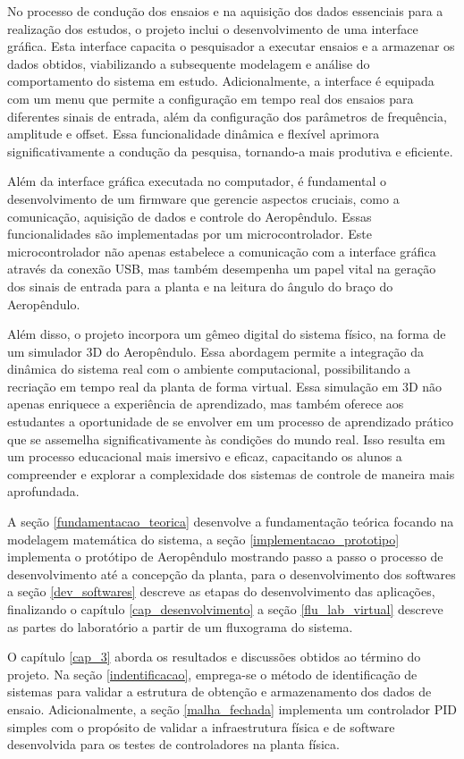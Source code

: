 No processo de condução dos ensaios e na aquisição dos dados essenciais para a realização dos estudos, o projeto inclui o desenvolvimento de uma interface gráfica. Esta interface capacita o pesquisador a executar ensaios e a armazenar os dados obtidos, viabilizando a subsequente modelagem e análise do comportamento do sistema em estudo. Adicionalmente, a interface é equipada com um menu que permite a configuração em tempo real dos ensaios para diferentes sinais de entrada, além da configuração dos parâmetros de frequência, amplitude e offset. Essa funcionalidade dinâmica e flexível aprimora significativamente a condução da pesquisa, tornando-a mais produtiva e eficiente.

Além da interface gráfica executada no computador, é fundamental o desenvolvimento de um firmware que gerencie aspectos cruciais, como a comunicação, aquisição de dados e controle do Aeropêndulo. Essas funcionalidades são implementadas por um microcontrolador. Este microcontrolador não apenas estabelece a comunicação com a interface gráfica através da conexão USB, mas também desempenha um papel vital na geração dos sinais de entrada para a planta e na leitura do ângulo do braço do Aeropêndulo.


Além disso, o projeto incorpora um gêmeo digital do sistema físico, na forma de um simulador 3D do Aeropêndulo. Essa abordagem permite a integração da dinâmica do sistema real com o ambiente computacional, possibilitando a recriação em tempo real da planta de forma virtual. Essa simulação em 3D não apenas enriquece a experiência de aprendizado, mas também oferece aos estudantes a oportunidade de se envolver em um processo de aprendizado prático que se assemelha significativamente às condições do mundo real. Isso resulta em um processo educacional mais imersivo e eficaz, capacitando os alunos a compreender e explorar a complexidade dos sistemas de controle de maneira mais aprofundada.

A seção \ref{fundamentacao_teorica} desenvolve a fundamentação teórica focando na modelagem matemática do sistema, a seção \ref{implementacao_prototipo} implementa o protótipo de Aeropêndulo mostrando passo a passo o processo de desenvolvimento até a concepção da planta, para o desenvolvimento dos softwares a seção \ref{dev_softwares} descreve as etapas do desenvolvimento das aplicações, finalizando o capítulo \ref{cap_desenvolvimento} a seção \ref{flu_lab_virtual} descreve as partes do laboratório a partir de um fluxograma do sistema.

O capítulo \ref{cap_3} aborda os resultados e discussões obtidos ao término do projeto. Na seção \ref{indentificacao}, emprega-se o método de identificação de sistemas para validar a estrutura de obtenção e armazenamento dos dados de ensaio. Adicionalmente, a seção \ref{malha_fechada} implementa um controlador PID simples com o propósito de validar a infraestrutura física e de software desenvolvida para os testes de controladores na planta física.

